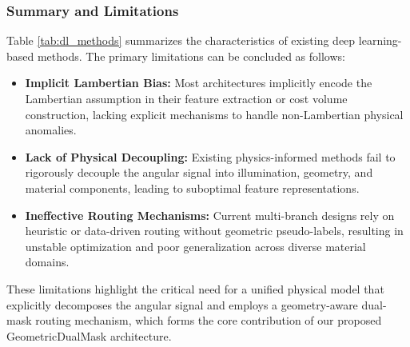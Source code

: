 \documentclass[lettersize,journal]{IEEEtran}
\begin{document}
\subsubsection{Summary and Limitations}
Table \ref{tab:dl_methods} summarizes the characteristics of existing deep learning-based methods. The primary limitations can be concluded as follows:
\begin{itemize}
\item \textbf{Implicit Lambertian Bias:} Most architectures implicitly encode the Lambertian assumption in their feature extraction or cost volume construction, lacking explicit mechanisms to handle non-Lambertian physical anomalies.
\item \textbf{Lack of Physical Decoupling:} Existing physics-informed methods fail to rigorously decouple the angular signal into illumination, geometry, and material components, leading to suboptimal feature representations.
\item \textbf{Ineffective Routing Mechanisms:} Current multi-branch designs rely on heuristic or data-driven routing without geometric pseudo-labels, resulting in unstable optimization and poor generalization across diverse material domains.
\end{itemize}

These limitations highlight the critical need for a unified physical model that explicitly decomposes the angular signal and employs a geometry-aware dual-mask routing mechanism, which forms the core contribution of our proposed GeometricDualMask architecture.

\begin{table}[!t]
\centering
\caption{Comparison of Deep Learning-based Light Field Depth Estimation Methods}
\label{tab:dl_methods}
\end{table}
\end{document}
